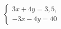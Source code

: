 \begin{ex}
	\begin{condition}
		\( \left\{
		\begin{array}{l}
			3x+4y=3,5,\\
			-3x-4y=40
		\end{array}
		\right. \)
	\end{condition}
\end{ex}